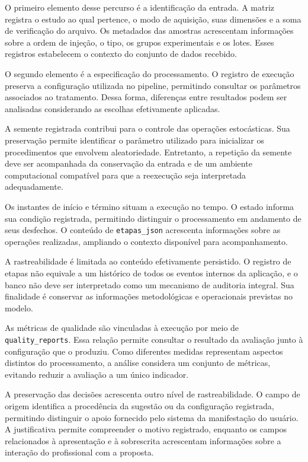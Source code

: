 O primeiro elemento desse percurso é a identificação da entrada. A matriz registra o estudo ao qual pertence, o modo de aquisição, suas dimensões e a soma de verificação do arquivo. Os metadados das amostras acrescentam informações sobre a ordem de injeção, o tipo, os grupos experimentais e os lotes. Esses registros estabelecem o contexto do conjunto de dados recebido.

O segundo elemento é a especificação do processamento. O registro de execução preserva a configuração utilizada no pipeline, permitindo consultar os parâmetros associados ao tratamento. Dessa forma, diferenças entre resultados podem ser analisadas considerando as escolhas efetivamente aplicadas.

A semente registrada contribui para o controle das operações estocásticas. Sua preservação permite identificar o parâmetro utilizado para inicializar os procedimentos que envolvem aleatoriedade. Entretanto, a repetição da semente deve ser acompanhada da conservação da entrada e de um ambiente computacional compatível para que a reexecução seja interpretada adequadamente.

Os instantes de início e término situam a execução no tempo. O estado informa sua condição registrada, permitindo distinguir o processamento em andamento de seus desfechos. O conteúdo de \texttt{etapas\_json} acrescenta informações sobre as operações realizadas, ampliando o contexto disponível para acompanhamento.

A rastreabilidade é limitada ao conteúdo efetivamente persistido. O registro de etapas não equivale a um histórico de todos os eventos internos da aplicação, e o banco não deve ser interpretado como um mecanismo de auditoria integral. Sua finalidade é conservar as informações metodológicas e operacionais previstas no modelo.

As métricas de qualidade são vinculadas à execução por meio de \texttt{quality\_reports}. Essa relação permite consultar o resultado da avaliação junto à configuração que o produziu. Como diferentes medidas representam aspectos distintos do processamento, a análise considera um conjunto de métricas, evitando reduzir a avaliação a um único indicador.

A preservação das decisões acrescenta outro nível de rastreabilidade. O campo de origem identifica a procedência da sugestão ou da configuração registrada, permitindo distinguir o apoio fornecido pelo sistema da manifestação do usuário. A justificativa permite compreender o motivo registrado, enquanto os campos relacionados à apresentação e à sobrescrita acrescentam informações sobre a interação do profissional com a proposta.


